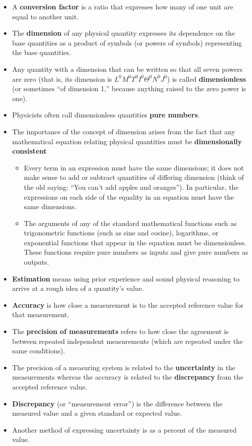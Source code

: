 \documentclass{report}
\begin{document}
\begin{itemize}
        \item A \textbf{conversion factor} is a ratio that expresses how many of one unit are equal to another unit.
        \item The \textbf{dimension} of any physical quantity expresses its dependence on the base quantities as a product of symbols (or powers of symbols) representing the base quantities.
        \item Any quantity with a dimension that can be written so that all seven powers are zero (that is, its dimension is \( L^0M^0T^0I^0\Theta^0N^0J^0 \)) is called \textbf{dimensionless} (or sometimes “of dimension 1,” because anything raised to the zero power is one). 
        \item  Physicists often call dimensionless quantities \textbf{pure numbers}.
        \item The importance of the concept of dimension arises from the fact that any mathematical equation relating physical quantities must be \textbf{dimensionally consistent}
            \begin{itemize}
                \item Every term in an expression must have the same dimensions; it does not make sense to add or subtract quantities of differing dimension (think of the old saying: “You can’t add apples and oranges”). In particular, the expressions on each side of the equality in an equation must have the same dimensions.
                \item The arguments of any of the standard mathematical functions such as trigonometric functions (such as sine and cosine), logarithms, or exponential functions that appear in the equation must be dimensionless. These functions require pure numbers as inputs and give pure numbers as outputs.
            \end{itemize}
        \item \textbf{Estimation} means using prior experience and sound physical reasoning to arrive at a rough idea of a quantity’s value.
        \item \textbf{Accuracy} is how close a measurement is to the accepted reference value for that measurement.
        \item The \textbf{precision of measurements} refers to how close the agreement is between repeated independent measurements (which are repeated under the same conditions).
        \item The precision of a measuring system is related to the \textbf{uncertainty} in the measurements whereas the accuracy is related to the \textbf{discrepancy} from the accepted reference value.
        \item \textbf{Discrepancy} (or “measurement error”) is the difference between the measured value and a given standard or expected value.
        \item   Another method of expressing uncertainty is as a percent of the measured value. 
    \end{itemize}
\end{document}
